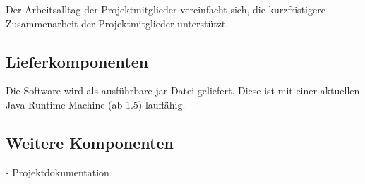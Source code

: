 Der Arbeitsalltag der Projektmitglieder vereinfacht sich, die kurzfristigere Zusammenarbeit der Projektmitglieder unterstützt.

\subsection{Lieferkomponenten}
Die Software wird als ausführbare jar-Datei geliefert. Diese ist mit einer aktuellen Java-Runtime Machine (ab 1.5) lauffähig.

\subsection{Weitere Komponenten}
 - Projektdokumentation